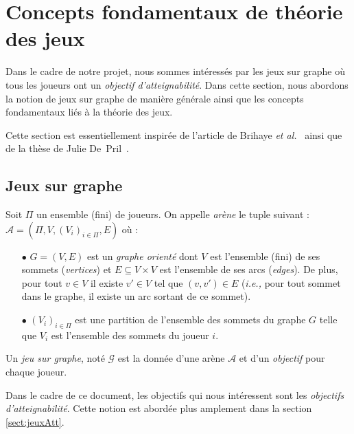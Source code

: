 
\section{Concepts fondamentaux de théorie des jeux}
\label{section:conceptsFond}

Dans le cadre de notre projet, nous sommes intéressés par les jeux sur graphe où tous les joueurs ont un \textit{objectif d'atteignabilité}.
Dans cette section, nous abordons la notion de jeux sur graphe de manière générale ainsi que les concepts fondamentaux liés à la théorie des jeux.

Cette section est essentiellement inspirée de l'article de Brihaye \emph{et al.}~\cite{DBLP:conf/lfcs/BrihayePS13} ainsi que de la thèse de Julie De~Pril~\cite{juliePhd}.

\subsection{Jeux sur graphe}




\begin{defi}[Arène]
	Soit $\Pi$ un ensemble (fini) de joueurs. On appelle \textit{arène} le tuple suivant :\\
	 $\mathcal{A} = (\Pi,V , (V_{i})_{i\in{\Pi}}, E )$ où :
	\begin{enumerate}
		\item[$\bullet$] $G = (V,E)$ est un \textit{graphe orienté}  dont $V$ est l'ensemble (fini) de ses sommets (\textit{vertices}) et $E \subseteq V \times V$ est l'ensemble de ses arcs (\textit{edges}). De plus, pour tout $ v\in V $ il existe $v'\in V$ tel que $(v,v') \in E$ (\emph{i.e.,} pour tout sommet dans le graphe, il existe un arc sortant de ce sommet).
		\item[$\bullet$] $(V_{i})_{i\in\Pi}$ est une partition de l'ensemble des sommets du graphe $G$ telle que $V_{i}$ est l'ensemble des sommets du joueur $i$.
	\end{enumerate}
\end{defi}


\begin{defi}
	Un \textit{jeu sur graphe}, noté $\mathcal{G}$ est la donnée d'une arène $\mathcal{A}$ et d'un \textit{objectif} pour chaque joueur.
\end{defi}


	Dans le cadre de ce document, les objectifs qui nous intéressent sont les \textit{objectifs d'atteignabilité}. Cette notion est abordée plus amplement dans la section \ref{sect:jeuxAtt}.


